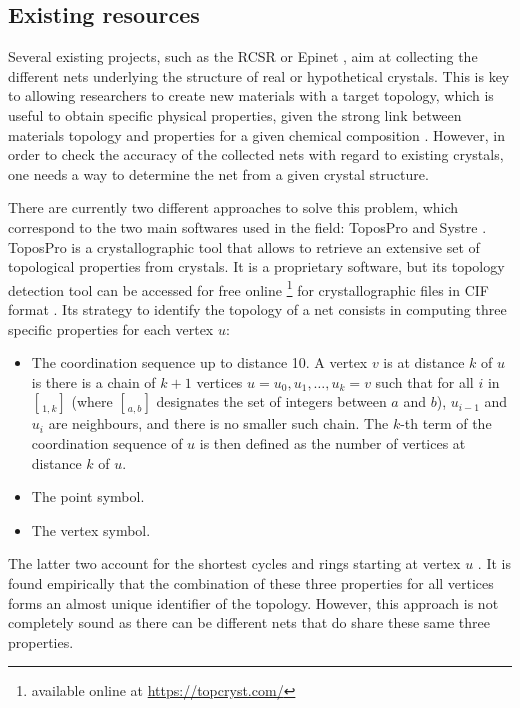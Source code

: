 \documentclass[main.tex]{subfiles}
\begin{document}
\subsection{Existing resources}

Several existing projects, such as the RCSR \autocite{RCSR} or Epinet \autocite{Epinet0,EPINET}, aim at collecting the different nets underlying the structure of real or hypothetical crystals. This is key to allowing researchers to create new materials with a target topology, which is useful to obtain specific physical properties, given the strong link between materials topology and properties for a given chemical composition \autocite{ZIF,ZeoliteTopologyAdsorptionCO2N2}. However, in order to check the accuracy of the collected nets with regard to existing crystals, one needs a way to determine the net from a given crystal structure.

There are currently two different approaches to solve this problem, which correspond to the two main softwares used in the field: ToposPro \autocite{ToposPro,TOPOS} and Systre \autocite{Systre}. ToposPro is a crystallographic tool that allows to retrieve an extensive set of topological properties from crystals. It is a proprietary software, but its topology detection tool can be accessed for free online \autocite{TopCryst}\footnote{available online at \url{https://topcryst.com/}} for crystallographic files in CIF format \autocite{CIF}. Its strategy to identify the topology of a net consists in computing three specific properties for each vertex $u$:
\label{coordinationsequence}
\begin{itemize}
	\item The coordination sequence up to distance 10.
	A vertex $v$ is at distance $k$ of $u$ is there is a chain of $k+1$ vertices $u = u_0,u_1,\ldots,u_k = v$ such that for all $i$ in $\brack{1,k}$ (where $\brack{a,b}$ designates the set of integers between $a$ and $b$), $u_{i-1}$ and $u_i$ are neighbours, and there is no smaller such chain. The $k$-th term of the coordination sequence of $u$ is then defined as the number of vertices at distance $k$ of $u$.
	\item The point symbol.
	\item The vertex symbol.
\end{itemize}
The latter two account for the shortest cycles and rings starting at vertex $u$ \autocite{Definitions, Terminology}.
It is found empirically that the combination of these three properties for all vertices forms an almost unique identifier of the topology. However, this approach is not completely sound as there can be different nets that do share these same three properties.
\end{document}
